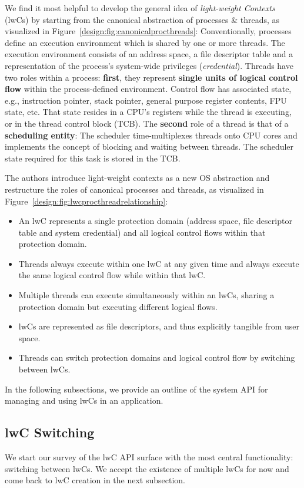 \documentclass[10pt,twocolumn,a4paper]{article}
\begin{document}
We find it most helpful to develop the general idea of \textit{light-weight Contexts} (lwCs) by starting from the canonical abstraction of processes \& threads, as visualized in Figure~\ref{design:fig:canonicalprocthreads}:
Conventionally, processes define an execution environment which is shared by one or more threads.
The execution environment consists of an address space, a file descriptor table and a representation of the process's system-wide privileges (\textit{credential}).
Threads have two roles within a process:
\textbf{first}, they represent \textbf{single units of logical control flow} within the process-defined environment.
Control flow has associated state, e.g., instruction pointer, stack pointer, general purpose register contents, FPU state, etc.
That state resides in a CPU's registers while the thread is executing, or in the thread control block (TCB).
The \textbf{second} role of a thread is that of a \textbf{scheduling entity}:
The scheduler time-multiplexes threads onto CPU cores and implements the concept of blocking and waiting between threads.
The scheduler state required for this task is stored in the TCB.

The authors introduce light-weight contexts as a new OS abstraction and restructure the roles of canonical processes and threads, as visualized in Figure~\ref{design:fig:lwcprocthreadrelationship}:
\begin{itemize}
\item An lwC represents a single protection domain (address space, file descriptor table and system credential) and all logical control flows within that protection domain.
\item Threads always execute within one lwC at any given time and always execute the same logical control flow while within that lwC.
\item Multiple threads can execute simultaneously within an lwCs, sharing a protection domain but executing different logical flows.
\item lwCs are represented as file descriptors, and thus explicitly tangible from user space.
\item Threads can switch protection domains and logical control flow by switching between lwCs.
\end{itemize}
\cite{lwcpaper,lwckernelrepo}

In the following subsections, we provide an outline of the system API for managing and using lwCs in an application.

\subsection{lwC Switching}\label{design:switching}
We start our survey of the lwC API surface with the most central functionality: switching between lwCs.
We accept the existence of multiple lwCs for now and come back to lwC creation in the next subsection.
\end{document}
